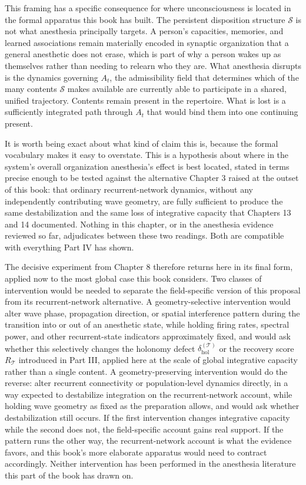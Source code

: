 \documentclass[11pt]{book}
\begin{document}
This framing has a specific consequence for where unconsciousness is located in the formal apparatus this book has built. The persistent disposition structure $\mathcal S$ is not what anesthesia principally targets. A person's capacities, memories, and learned associations remain materially encoded in synaptic organization that a general anesthetic does not erase, which is part of why a person wakes up as themselves rather than needing to relearn who they are. What anesthesia disrupts is the dynamics governing $A_t$, the admissibility field that determines which of the many contents $\mathcal S$ makes available are currently able to participate in a shared, unified trajectory. Contents remain present in the repertoire. What is lost is a sufficiently integrated path through $A_t$ that would bind them into one continuing present.

It is worth being exact about what kind of claim this is, because the formal vocabulary makes it easy to overstate. This is a hypothesis about where in the system's overall organization anesthesia's effect is best located, stated in terms precise enough to be tested against the alternative Chapter 3 raised at the outset of this book: that ordinary recurrent-network dynamics, without any independently contributing wave geometry, are fully sufficient to produce the same destabilization and the same loss of integrative capacity that Chapters 13 and 14 documented. Nothing in this chapter, or in the anesthesia evidence reviewed so far, adjudicates between these two readings. Both are compatible with everything Part IV has shown.

The decisive experiment from Chapter 8 therefore returns here in its final form, applied now to the most global case this book considers. Two classes of intervention would be needed to separate the field-specific version of this proposal from its recurrent-network alternative. A geometry-selective intervention would alter wave phase, propagation direction, or spatial interference pattern during the transition into or out of an anesthetic state, while holding firing rates, spectral power, and other recurrent-state indicators approximately fixed, and would ask whether this selectively changes the holonomy defect $\delta_{\mathrm{hol}}^{(\mathcal T)}$ or the recovery score $R_{\mathcal T}$ introduced in Part III, applied here at the scale of global integrative capacity rather than a single content. A geometry-preserving intervention would do the reverse: alter recurrent connectivity or population-level dynamics directly, in a way expected to destabilize integration on the recurrent-network account, while holding wave geometry as fixed as the preparation allows, and would ask whether destabilization still occurs. If the first intervention changes integrative capacity while the second does not, the field-specific account gains real support. If the pattern runs the other way, the recurrent-network account is what the evidence favors, and this book's more elaborate apparatus would need to contract accordingly. Neither intervention has been performed in the anesthesia literature this part of the book has drawn on.
\end{document}
